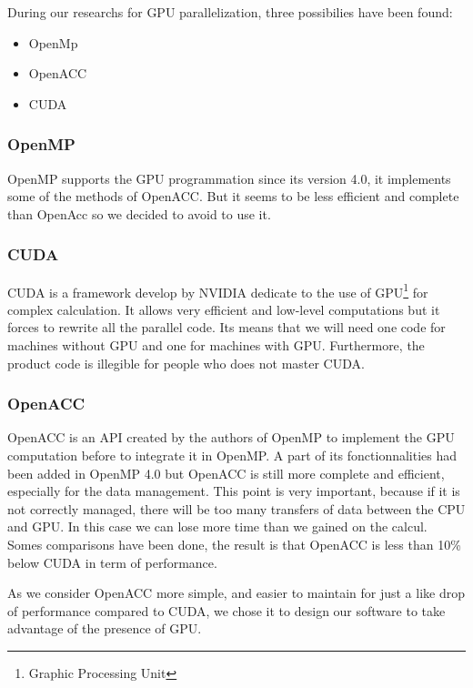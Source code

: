 During our researchs for GPU parallelization, three possibilies have been found:
\begin{itemize}
\item OpenMp
\item OpenACC
\item CUDA
\end{itemize}


\subsubsection{OpenMP}
OpenMP supports the GPU programmation since its version 4.0, it implements some of the methods of OpenACC. But it seems to be less efficient and complete than OpenAcc so we decided to avoid to use it.

\subsubsection{CUDA}
CUDA is a framework develop by NVIDIA dedicate to the use of GPU\footnote{Graphic Processing Unit} for complex calculation. It allows very efficient and low-level computations but it forces to rewrite all the parallel code. Its means that we will need one code for machines without GPU and one for machines with GPU. Furthermore, the product code is illegible for people who does not master CUDA.

\subsubsection{OpenACC}
OpenACC is an API created by the authors of OpenMP to implement the GPU computation before to integrate it in OpenMP. A part of its fonctionnalities had been added in OpenMP 4.0 but OpenACC is still more complete and efficient, especially for the data management. This point is very important, because if it is not correctly managed, there will be too many transfers of data between the CPU and GPU. In this case we can lose more time than we gained on the calcul. Somes comparisons have been done, the result is that OpenACC is less than 10\% below CUDA in term of performance. 

As we consider OpenACC more simple, and easier to maintain for just a like drop of performance compared to CUDA, we chose it to design our software to take advantage of the presence of GPU.
